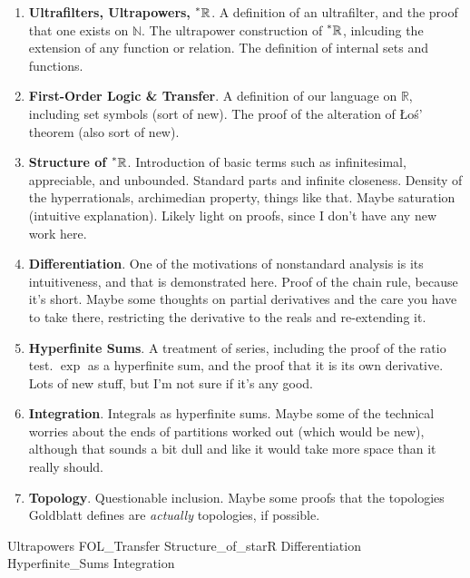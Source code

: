 \documentclass{article}
\newcommand{\reals}{\mathbb{R}}
\newcommand{\hreals}{\prescript{*}{}{\mathbb{R}}}
\newcommand{\nats}{\mathbb{N}}
\theoremstyle{definition}
\begin{document}
\begin{enumerate}
    \item \textbf{Ultrafilters, Ultrapowers, $\hreals$}. A definition of an ultrafilter, and the proof that one exists on $\nats$. The ultrapower construction of $\hreals$, inlcuding the extension of any function or relation. The definition of internal sets and functions.
    \item \textbf{First-Order Logic \& Transfer}. A definition of our language on $\reals$, including set symbols (sort of new). The proof of the alteration of \L o\'s' theorem (also sort of new).
    \item \textbf{Structure of $\hreals$}. Introduction of basic terms such as infinitesimal, appreciable, and unbounded. Standard parts and infinite closeness. Density of the hyperrationals, archimedian property, things like that. Maybe saturation (intuitive explanation). Likely light on proofs, since I don't have any new work here.
    \item \textbf{Differentiation}. One of the motivations of nonstandard analysis is its intuitiveness, and that is demonstrated here. Proof of the chain rule, because it's short. Maybe some thoughts on partial derivatives and the care you have to take there, restricting the derivative to the reals and re-extending it.
    \item \textbf{Hyperfinite Sums}. A treatment of series, including the proof of the ratio test. $\exp$ as a hyperfinite sum, and the proof that it is its own derivative. Lots of new stuff, but I'm not sure if it's any good.
    \item \textbf{Integration}. Integrals as hyperfinite sums. Maybe some of the technical worries about the ends of partitions worked out (which would be new), although that sounds a bit dull and like it would take more space than it really should. 
    \item \textbf{Topology}. Questionable inclusion. Maybe some proofs that the topologies Goldblatt defines are \textit{actually} topologies, if possible.
\end{enumerate}

{Ultrapowers}
{FOL_Transfer}
{Structure_of_starR}
{Differentiation}
{Hyperfinite_Sums}
{Integration}

\nocite{*}
\printbibliography
\end{document}

